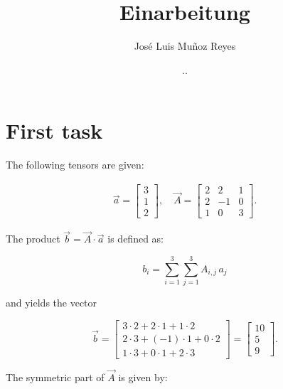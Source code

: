 \documentclass[12pt,bibstyle=none,pagenumberinfooter]{ifmdocument}
\author{José Luis Muñoz Reyes}
\title{Einarbeitung}
\date{\the\day.\the\month.\the\year}
\begin{document}
\maketitle
\section{First task}

The following tensors are given:

\begin{gather}
    \vec{a} = \begin{bmatrix}
        3 \\ 1 \\ 2
    \end{bmatrix}, \quad
    \vec{A} = \begin{bmatrix}
        2 & 2 & 1 \\ 2 & -1 & 0 \\ 1 & 0 & 3
    \end{bmatrix} .
\end{gather}

The product $\Vec{b} = \Vec{A}\cdot \Vec{a}$ is defined as:

\begin{equation}
    b_i = \sum\limits_{i=1}^3 \sum\limits_{j=1}^3  A_{i,j} \, a_j
\end{equation}

and yields the vector

\begin{equation}
    \Vec{b} = \begin{bmatrix}
        3\cdot 2 + 2\cdot1 + 1\cdot2 \\ 2\cdot3 + (-1)\cdot1 + 0\cdot2 \\ 1\cdot3 + 0\cdot1 + 2\cdot3
    \end{bmatrix}
    = \begin{bmatrix}
        10 \\ 5 \\ 9
    \end{bmatrix}.
\end{equation}

The symmetric part of $\vec{A}$ is given by:
\end{document}

